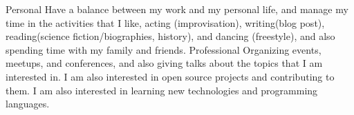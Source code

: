 
\begin{cventries}

    \cventry
    {} %
    {Personal} %
    {}
    {}
    {Have a balance between my work and my personal life, and manage my time in the activities that I like, acting (improvisation), writing(blog post), reading(science fiction/biographies, history), and dancing (freestyle), and also spending time with my family and friends.}
    \vspace{0.5cm}
    \cventry
    {} %
    {Professional} %
    {}
    {}
    {Organizing events, meetups, and conferences, and also giving talks about the topics that I am interested in. I am also interested in open source projects and contributing to them. I am also interested in learning new technologies and programming languages.}
\end{cventries}
